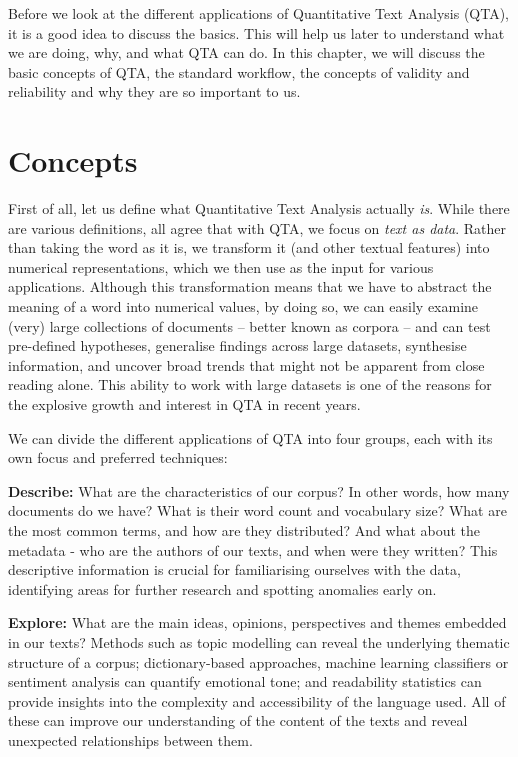 \documentclass[
]{book}
\begin{document}
Before we look at the different applications of Quantitative Text Analysis (QTA), it is a good idea to discuss the basics. This will help us later to understand what we are doing, why, and what QTA can do. In this chapter, we will discuss the basic concepts of QTA, the standard workflow, the concepts of validity and reliability and why they are so important to us.

\section{Concepts}\label{concepts}

First of all, let us define what Quantitative Text Analysis actually \emph{is}. While there are various definitions, all agree that with QTA, we focus on \emph{text as data}. Rather than taking the word as it is, we transform it (and other textual features) into numerical representations, which we then use as the input for various applications. Although this transformation means that we have to abstract the meaning of a word into numerical values, by doing so, we can easily examine (very) large collections of documents -- better known as corpora -- and can test pre-defined hypotheses, generalise findings across large datasets, synthesise information, and uncover broad trends that might not be apparent from close reading alone. This ability to work with large datasets is one of the reasons for the explosive growth and interest in QTA in recent years.

We can divide the different applications of QTA into four groups, each with its own focus and preferred techniques:

\textbf{Describe:} What are the characteristics of our corpus? In other words, how many documents do we have? What is their word count and vocabulary size? What are the most common terms, and how are they distributed? And what about the metadata - who are the authors of our texts, and when were they written? This descriptive information is crucial for familiarising ourselves with the data, identifying areas for further research and spotting anomalies early on.

\textbf{Explore:} What are the main ideas, opinions, perspectives and themes embedded in our texts? Methods such as topic modelling can reveal the underlying thematic structure of a corpus; dictionary-based approaches, machine learning classifiers or sentiment analysis can quantify emotional tone; and readability statistics can provide insights into the complexity and accessibility of the language used. All of these can improve our understanding of the content of the texts and reveal unexpected relationships between them.
\end{document}
